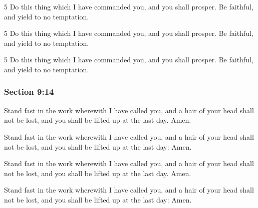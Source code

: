 		\begin{framed}
		\scriptsize
			\begin{compactdesc}
				\item[JSP] 5 Do this thing which I have commanded you, and you shall prosper. Be faithful, and yield to no temptation.
				\item[RB1] [\textit{missing}]
				\item[DC 1835] 5 Do this thing which I have commanded you, and you shall prosper. Be faithful, and yield to no temptation. 
				\item[DC 1844] 5 Do this thing which I have commanded you, and you shall prosper. Be faithful, and yield to no temptation.
			\end{compactdesc}
		\end{framed}

	\subsubsection{Section 9:14} %
		\label{DC9-14}

		Stand fast in the work wherewith I have called you, and a hair of your head shall not be lost, and you shall be lifted up at the last day.  Amen.

		\begin{framed}
		\scriptsize
			\begin{compactdesc}
				\item[JSP] Stand fast in the work wherewith I have called you, and a hair of your head shall not be lost, and you shall be lifted up at the last day: Amen.
				\item[RB1] [\textit{missing}]
				\item[DC 1835] Stand fast in the work wherewith I have called you, and a hair of your head shall not be lost, and you shall be lifted up at the last day. Amen.
				\item[DC 1844] Stand fast in the work wherewith I have called you, and a hair of your head shall not be lost, and you shall be lifted up at the last day: Amen.
			\end{compactdesc}
		\end{framed}